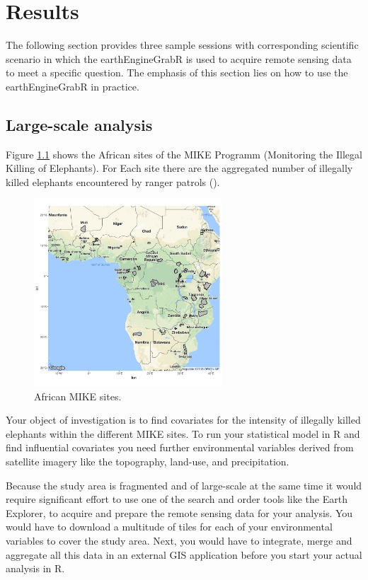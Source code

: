 \chapter{Results}

The following section provides three sample sessions with corresponding scientific scenario in which the earthEngineGrabR is used to acquire remote sensing data to meet a specific question. The emphasis of this section lies on how to use the earthEngineGrabR in practice.

\section{Large-scale analysis}

Figure \ref{territories} shows the African sites of the MIKE Programm (Monitoring the Illegal Killing of Elephants). 
For Each site there are the aggregated number of illegally killed elephants encountered by ranger patrols (\cite{burn2011global}).


\begin{figure}
	\begin{center}
		\includegraphics[width=7cm]{images/territories.pdf}
	\end{center}
	\caption{African MIKE sites.}
	\label{territories}
\end{figure}


Your object of investigation is to find covariates for the intensity of illegally killed elephants within the different MIKE sites.
To run your statistical model in R and find influential covariates you need further environmental variables derived from satellite imagery like the topography, land-use, and precipitation. 

Because the study area is fragmented and of large-scale at the same time it would require significant effort to use one of the search and order tools like the Earth Explorer, to acquire and prepare the remote sensing data for your analysis. You would have to download a multitude of tiles for each of your environmental variables to cover the study area. Next, you would have to integrate, merge and aggregate all this data in an external GIS application before you start your actual analysis in R.


